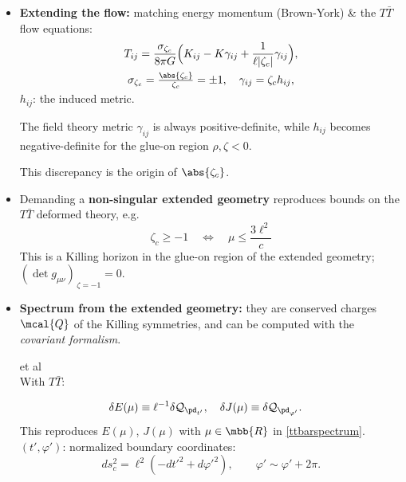 \documentclass[10pt]{article}
\newcommand{\citations}[1]{{\footnotesize#1\par}}
\newcommand{\TTbar}{\texorpdfstring{\ensuremath{T\bar{T}}}{TTbar}\xspace}
\begin{document}
\begin{multicols}{3}
\begin{itemize}
\item \textbf{Extending the flow:} matching energy momentum (Brown-York) \& the \TTbar flow equations:
	\begin{equation}
	\begin{gathered}
		T_{ij}= \frac{\sigma_{\zeta_c}}{8\pi G} \Big( K_{ij} -  K \gamma_{ij} + \frac{1}{\ell |\zeta_c|}\gamma_{ij}\Big), \\ \sigma_{\zeta_c} = \tfrac{\abs{\zeta_c}}{\zeta_c} = \pm 1,\quad
		\gamma_{ij} = \zeta_c h_{ij}, \\[-1ex]
	\end{gathered}	\label{BYtensor}
	\end{equation}
	$h_{ij}$: the induced metric. 
	
	The field theory metric $\gamma_{ij}$ is always positive-definite, while $h_{ij}$ becomes negative-definite for the glue-on region $\rho,\zeta < 0$.
	
	This discrepancy is the origin of $\abs{\zeta_c}$.

%
%

\item Demanding a \textbf{non-singular extended geometry} reproduces bounds on the \TTbar deformed theory, e.g.
	\begin{equation}
		\zeta_c \ge -1 \quad \Leftrightarrow \quad\mu\le \frac{ 3\ell^2 }{c} \label{reality}
	\end{equation}
	This is a Killing horizon in the glue-on region of the \mbox{extended} geometry;
	$(\det g_{\mu\nu})_{\,\zeta = -1} = 0$.

\item \textbf{Spectrum from the extended geometry:} they are \mbox{conserved} charges $\mcal{Q}$ of the Killing symmetries, and can be computed with the \textit{covariant formalism}.

\citations{
	\textsl{\citeauthor{Iyer:1994ys,Barnich:2001jy}} et al\\
	With \TTbar: \textcite{Kraus:2021cwf}
}\vspace{-1.5\baselineskip}
	\begin{align*}
		\delta E(\mu) &\equiv  \ell^{-1} \delta \mathcal Q_{\pd_{t'}}, \quad \delta J(\mu) \equiv  \delta \mathcal Q_{\pd_{\varphi'}}.
	\end{align*}
	This reproduces $E(\mu)$, $J(\mu)$ with $\mu \in\mbb{R}$ in \eqref{ttbarspectrum}.\\
	$(t',\varphi')$: normalized boundary coordinates:
	\begin{equation}
		ds^2_c = \ell^2 ( -dt'^2 + d\varphi'^2) , \qquad \varphi' \sim \varphi' + 2\pi.\label{cutoffmetric}
	\end{equation}


\end{itemize}
\end{multicols}
\end{document}
